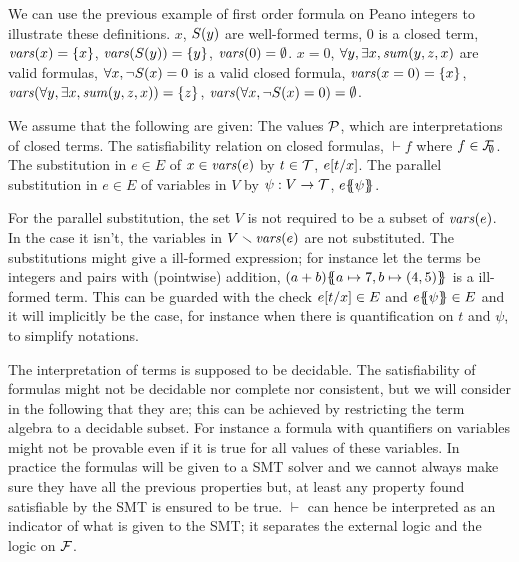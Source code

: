 \documentclass{article}
\begin{document}
We can use the previous example of first order formula on Peano integers to illustrate these definitions.
\(x\), \(S{\left(y\right)}\) are well-formed terms, \(0\) is a closed term, \(\mathit{vars}{\left(x\right)} = {\left\{x\right\}}\), \(\mathit{vars}{\left(S{\left(y\right)}\right)} = {\left\{y\right\}}\), \(\mathit{vars}{\left(0\right)} = \emptyset\).
\(x = 0\), \(\forall y, \exists x, \mathit{sum}{\left(y, z, x\right)}\) are valid formulas, \(\forall x, \neg S{\left(x\right)} = 0\) is a valid closed formula, \(\mathit{vars}{\left(x = 0\right)} = {\left\{x\right\}}\), \(\mathit{vars}{\left(\forall y, \exists x, \mathit{sum}{\left(y, z, x\right)}\right)} = {\left\{z\right\}}\), \(\mathit{vars}{\left(\forall x, \neg S{\left(x\right)} = 0\right)} = \emptyset\).
\begin{defi}
We assume that the following are given:
 The values \(\mathcal{P}\), which are interpretations of closed terms.
 The satisfiability relation on closed formulas, \({\vdash} f\) where \(f \in {\mathcal{F}}_{\!\!\emptyset}\).
 The substitution in \(e \in E\) of \(x \in \mathit{vars}{\left(e\right)}\) by \(t \in {\mathcal{T}}\), \(e{\left[t\middle/x\right]}\).
 The parallel substitution in \(e \in E\) of variables in \(V\) by \(\psi: V \to {\mathcal{T}}\), \(e{\left\{\!\!{\left\{\psi\right\}}\!\!\right\}}\).
\end{defi}
For the parallel substitution, the set \(V\) is not required to be a subset of \(\mathit{vars}{\left(e\right)}\).
In the case it isn't, the variables in \(V \smallsetminus \mathit{vars}{\left(e\right)}\) are not substituted.
The substitutions might give a ill-formed expression; for instance let the terms be integers and pairs with (pointwise) addition, \({\left(a + b\right)}{\left\{\!\!{\left\{a \mapsto 7, b \mapsto {\left(4, 5\right)}\right\}}\!\!\right\}}\) is a ill-formed term.
This can be guarded with the check \(e{\left[t\middle/x\right]} \in E\) and \(e{\left\{\!\!{\left\{\psi\right\}}\!\!\right\}} \in E\) and it will implicitly be the case, for instance when there is quantification on \(t\) and \(\psi\), to simplify notations.

The interpretation of terms is supposed to be decidable.
The satisfiability of formulas might not be decidable nor complete nor consistent,
but we will consider in the following that they are; this can be achieved by restricting the term algebra to a decidable subset.
For instance a formula with quantifiers on variables might not be provable even if it is true for all values of these variables.
In practice the formulas will be given to a SMT solver and we cannot always make sure they have all the previous properties but, at least any property found satisfiable by the SMT is ensured to be true.
\(\vdash\) can hence be interpreted as an indicator of what is given to the SMT; it separates the external logic and the logic on \({\mathcal{F}}\).
\end{document}
